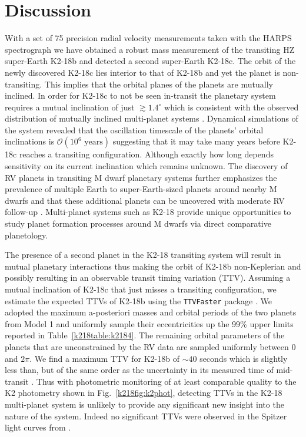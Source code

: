 \section{Discussion} \label{k218sect:disc}
With a set of 75 precision radial velocity measurements taken with the HARPS spectrograph
we have obtained a robust mass measurement of the transiting HZ super-Earth K2-18b and
detected a second super-Earth K2-18c. The orbit of the newly discovered K2-18c lies
interior to that of K2-18b and yet the planet is non-transiting. This implies that the orbital
planes of the planets are mutually inclined. In order for K2-18c
to not be seen in-transit the planetary system requires a mutual inclination of just
$\gtrsim 1.4^{\circ}$ which is consistent with the observed distribution of mutually inclined
multi-planet systems \citep{figueira12, fabrycky14}. Dynamical simulations of the system
revealed that the oscillation timescale of the planets' orbital inclinations is
$\mathcal{O}(10^6 \text{ years})$ suggesting that it may take many years before K2-18c reaches a transiting
configuration. Although exactly how long depends sensitivity on its current inclination which remains
unknown. The discovery of RV planets in transiting M dwarf planetary systems 
further emphasizes the prevalence of multiple Earth to super-Earth-sized planets around
nearby M dwarfs and that these additional planets can be uncovered with moderate RV follow-up
\citep{cloutier17}. Multi-planet systems such as K2-18 provide unique opportunities to study
planet formation processes around M dwarfs via direct comparative planetology. 

The presence of a second planet in the K2-18 transiting system will result in mutual 
planetary interactions thus making the orbit of K2-18b non-Keplerian and possibly resulting
in an observable transit timing variation (TTV). Assuming a mutual inclination of K2-18c
that just misses a transiting configuration, we estimate the expected TTVs 
of K2-18b using the \texttt{TTVFaster} package \citep{deck14, agol16}. We adopted the maximum a-posteriori
masses and orbital periods of the two planets from Model 1 and uniformly sample their
eccentricities up the 99\%
upper limits reported in Table~\ref{k218table:k2184}. The remaining orbital parameters of the planets that
are unconstrained by the RV data 
are sampled uniformly between 0 and $2\pi$. We find a maximum TTV for K2-18b of $\sim 40$
seconds which is slightly less than, but of the same order as the uncertainty in its measured
time of mid-transit .
Thus with photometric monitoring of at least comparable quality to the K2 photometry
shown in Fig.~\ref{k218fig:k2phot}, detecting TTVs in the K2-18 multi-planet system is unlikely to provide
any significant new insight into the nature of the system. Indeed no significant TTVs were observed in
the Spitzer light curves from .

